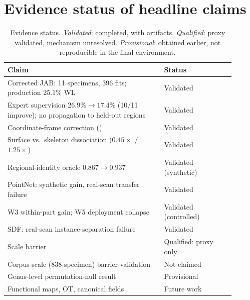 \section{Evidence status of headline claims}

\begin{table}[!htb]
\centering
\caption{Evidence status. \emph{Validated}: completed, with artifacts.
\emph{Qualified}: proxy validated, mechanism unresolved.
\emph{Provisional}: obtained earlier, not reproducible in the final
environment.}
\label{tab:evidence}
\small
\begin{tabular}{@{}p{0.62\linewidth}p{0.28\linewidth}@{}}
\toprule
\textbf{Claim} & \textbf{Status} \\
\midrule
Corrected JAB: 11 specimens, 396 fits; production $25.1\%$ WL & Validated \\
Expert supervision $26.9\%\to17.4\%$ (10/11 improve); no propagation to
  held-out regions & Validated \\
Coordinate-frame correction (\F{F7}) & Validated \\
Surface vs.\ skeleton dissociation ($0.45\times$ / $1.25\times$) & Validated \\
Regional-identity oracle $0.867\to0.937$ & Validated (synthetic) \\
PointNet: synthetic gain, real-scan transfer failure & Validated \\
W3 within-part gain; W5 deployment collapse & Validated (controlled) \\
SDF: real-scan instance-separation failure & Validated \\
Scale barrier & Qualified: proxy only \\
Corpus-scale (838-specimen) barrier validation & Not claimed \\
Genus-level permutation-null result & Provisional \\
Functional maps, OT, canonical fields & Future work \\
\bottomrule
\end{tabular}
\end{table}

